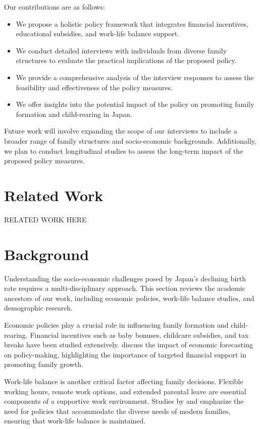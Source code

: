 \documentclass{article} %
\begin{document}
Our contributions are as follows:
\begin{itemize}
    \item We propose a holistic policy framework that integrates financial incentives, educational subsidies, and work-life balance support.
    \item We conduct detailed interviews with individuals from diverse family structures to evaluate the practical implications of the proposed policy.
    \item We provide a comprehensive analysis of the interview responses to assess the feasibility and effectiveness of the policy measures.
    \item We offer insights into the potential impact of the policy on promoting family formation and child-rearing in Japan.
\end{itemize}

Future work will involve expanding the scope of our interviews to include a broader range of family structures and socio-economic backgrounds. Additionally, we plan to conduct longitudinal studies to assess the long-term impact of the proposed policy measures.

\section{Related Work}
\label{sec:related}
RELATED WORK HERE

\section{Background}
\label{sec:background}

Understanding the socio-economic challenges posed by Japan's declining birth rate requires a multi-disciplinary approach. This section reviews the academic ancestors of our work, including economic policies, work-life balance studies, and demographic research.

Economic policies play a crucial role in influencing family formation and child-rearing. Financial incentives such as baby bonuses, childcare subsidies, and tax breaks have been studied extensively. \citet{poledna2023economic} discuss the impact of economic forecasting on policy-making, highlighting the importance of targeted financial support in promoting family growth.

Work-life balance is another critical factor affecting family decisions. Flexible working hours, remote work options, and extended parental leave are essential components of a supportive work environment. Studies by \citet{west2023agent} and \citet{zhou2023peer} emphasize the need for policies that accommodate the diverse needs of modern families, ensuring that work-life balance is maintained.
\end{document}
